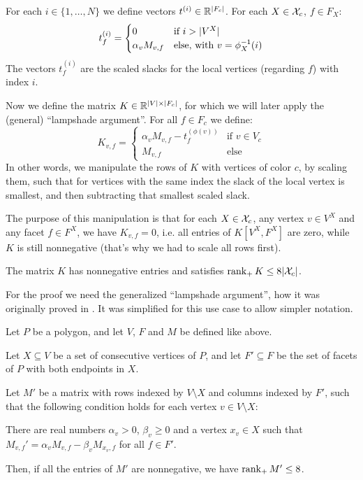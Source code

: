 For each $i \in \{1,\dots,N\}$ we define vectors $t^{(i)} \in \mathbb{R}^{\lvert F_c\rvert}$. For each $X \in \mathcal{X}_c$, $f \in F_X$:
\begin{equation*}
  t_f^{(i)} =
  \begin{cases}
    0                & \text{if } i > \lvert V^X\rvert              \\
    \alpha_v M_{v,f} & \text{else, with } v = \phi_X^{-1}(i)
  \end{cases}
\end{equation*}
The vectors $t_f^{(i)}$ are the scaled slacks for the local vertices (regarding $f$) with index $i$.

Now we define the matrix $K \in \mathbb{R}^{\lvert V\rvert \times \lvert F_c\rvert}$, for which we will later apply the (general) ``lampshade argument''. For all $f \in F_c$ we define:
\begin{equation*}
  K_{v,f} =
  \begin{cases}
    \alpha_v M_{v,f} - t_f^{(\phi(v))} & \text{if } v \in V_c \\
    M_{v,f}                            & \text{else}
  \end{cases}
\end{equation*}
In other words, we manipulate the rows of $K$ with vertices of color $c$, by scaling them, such that for vertices with the same index the slack of the local vertex is smallest, and then subtracting that smallest scaled slack.

The purpose of this manipulation is that for each $X \in \mathcal{X}_c$, any vertex $v \in V^X$ and any facet $f \in F^X$, we have $K_{v,f} = 0$, i.e. all entries of $K[V^X, F^X]$ are zero, while $K$ is still nonnegative (that's why we had to scale all rows first).

\begin{lemma}\label{lemma:rank-of-K}
  The matrix $K$ has nonnegative entries and satisfies $\operatorname{rank}_+ K \leq 8\lvert\mathcal{X}_c\rvert$.
\end{lemma}

For the proof we need the generalized ``lampshade argument'', how it was originally proved in \cite[Lemma 3.1]{shitov2014sublinear}. It was simplified for this use case to allow simpler notation.

\begin{lemma}\label{lemma:shitov-lampshade}
  Let $P$ be a polygon, and let $V$, $F$ and $M$ be defined like above.

  Let $X \subseteq V$ be a set of consecutive vertices of $P$, and let $F' \subseteq F$ be the set of facets of $P$ with both endpoints in $X$.

  Let $M'$ be a matrix with rows indexed by $V\setminus X$ and columns indexed by $F'$, such that the following condition holds for each vertex $v\in V\setminus X$:

  There are real numbers $\alpha_v>0$, $\beta_v\geq 0$ and a vertex $x_v\in X$ such that\\
  $M_{v,f}'=\alpha_v M_{v,f}-\beta_v M_{x_v,f}$ for all $f\in F'$.

  Then, if all the entries of $M'$ are nonnegative, we have $\operatorname{rank}_+ M'\le 8$.
\end{lemma}

